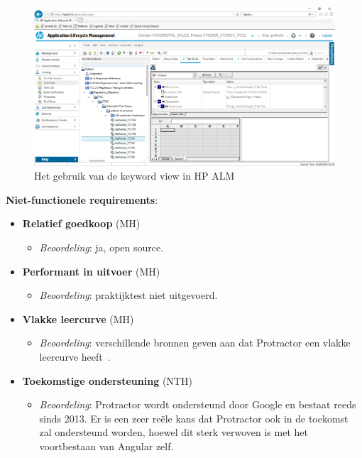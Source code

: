 \begin{figure}[h!]
    \centering
    \includegraphics[scale=0.35]{img/corpus/hpalm12-testplan-keywordview.PNG}
    \caption{Het gebruik van de keyword view in HP ALM}
    \label{fig:uft-keywordview}
\end{figure}

\textbf{Niet-functionele requirements}:
\begin{itemize}
	\item \textbf{Relatief goedkoop} (MH)
	\begin{itemize}
		\item \emph{Beoordeling}: ja, open source.
	\end{itemize}
	\item \textbf{Performant in uitvoer} (MH)
	\begin{itemize}
		\item \emph{Beoordeling}: praktijktest niet uitgevoerd.
	\end{itemize}
	\item \textbf{Vlakke leercurve} (MH)
	\begin{itemize}
		\item \emph{Beoordeling}: verschillende bronnen geven aan dat Protractor een vlakke leercurve heeft~\autocite{Mahajan2019, Zavelevsky2014, Enishetti}.
	\end{itemize}
	\item \textbf{Toekomstige ondersteuning} (NTH)
	\begin{itemize}
		\item \emph{Beoordeling}: Protractor wordt ondersteund door Google en bestaat reeds sinds 2013. Er is een zeer reële kans dat Protractor ook in de toekomst zal ondersteund worden, hoewel dit sterk verwoven is met het voortbestaan van Angular zelf.
	\end{itemize}
\end{itemize}